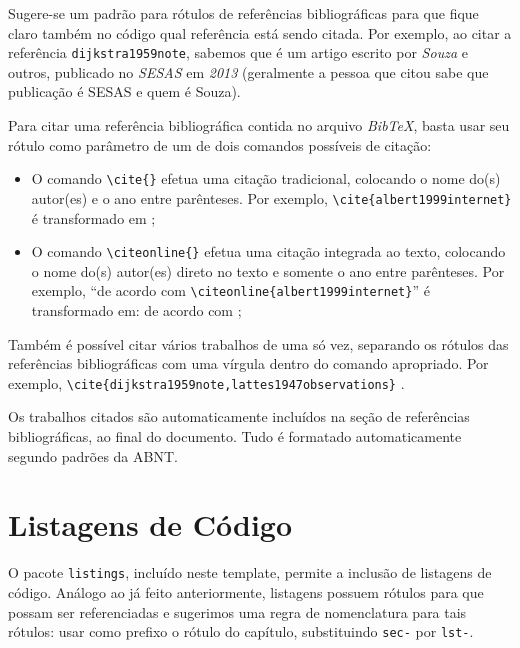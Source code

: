 Sugere-se um padrão para rótulos de referências bibliográficas para que fique claro também no código \latex qual referência está sendo citada. Por exemplo, ao citar a referência \texttt{dijkstra1959note}, sabemos que é um artigo escrito por \emph{Souza} e outros, publicado no \emph{SESAS} em \emph{2013} (geralmente a pessoa que citou sabe que publicação é SESAS e quem é Souza).

Para citar uma referência bibliográfica contida no arquivo \emph{BibTeX}, basta usar seu rótulo como parâmetro de um de dois comandos possíveis de citação:

\begin{itemize}
\item O comando \texttt{\textbackslash cite\{\}} efetua uma citação tradicional, colocando o nome do(s) autor(es) e o ano entre parênteses. Por exemplo, \texttt{\textbackslash cite\{albert1999internet\}} é transformado em \cite{albert1999internet};





\item O comando \texttt{\textbackslash citeonline\{\}} efetua uma citação integrada ao texto, colocando o nome do(s) autor(es) direto no texto e somente o ano entre parênteses. Por exemplo, ``de acordo com \texttt{\textbackslash citeonline\{albert1999internet\}}'' é transformado em: de acordo com ;
\end{itemize}

Também é possível citar vários trabalhos de uma só vez, separando os rótulos das referências bibliográficas com uma vírgula dentro do comando apropriado. Por exemplo, \texttt{\textbackslash cite\{dijkstra1959note,lattes1947observations\}} \cite{dijkstra1959note,lattes1947observations}.

Os trabalhos citados são automaticamente incluídos na seção de referências bibliográficas, ao final do documento. Tudo é formatado automaticamente segundo padrões da ABNT.



\section{Listagens de Código}
\label{sec-fundteo-listagens}

O pacote \texttt{listings}, incluído neste template, permite a inclusão de listagens de código. Análogo ao já feito anteriormente, listagens possuem rótulos para que possam ser referenciadas e sugerimos uma regra de nomenclatura para tais rótulos: usar como prefixo o rótulo do capítulo, substituindo \texttt{sec-} por \texttt{lst-}.

